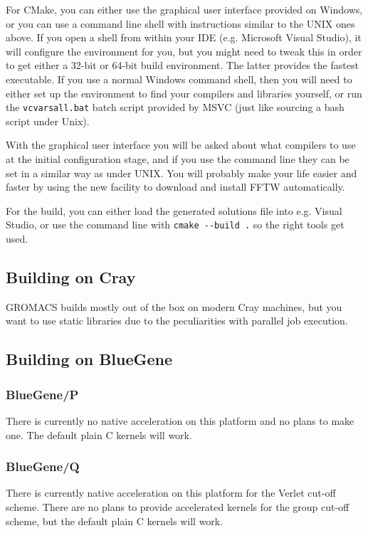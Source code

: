 \documentclass{article}[12pt,a4paper,twoside]
\newcommand{\gromacs}{GROMACS}
\newcommand{\fftw}{FFTW}
\newcommand{\cmake}{CMake}
\begin{document}
\begin{enumerate}
For \cmake{}, you can either use the graphical user interface provided
on Windows, or you can use a command line shell with instructions
similar to the UNIX ones above. If you open a shell from within
your IDE (e.g. Microsoft Visual Studio), it will configure the
environment for you, but you might need to tweak this in order to 
get either a 32-bit or 64-bit build environment. The latter provides the
fastest executable. If you use a normal Windows command shell, then
you will need to either set up the environment to find your compilers
and libraries yourself, or run the \verb+vcvarsall.bat+ batch script
provided by MSVC (just like sourcing a bash script under
Unix). 

With the graphical user interface you will be asked about what compilers
to use at the initial configuration stage, and if you use the command line
they can be set in a similar way as under UNIX.
You will probably make your life easier and faster by using the
new facility to download and install \fftw{} automatically. 

For the build, you can either load the generated solutions file into
e.g. Visual Studio, or use the command line with \verb+cmake --build .+ 
so the right tools get used.

\subsection{Building on Cray}

\gromacs{} builds mostly out of the box on modern Cray machines,
but you want to use static libraries due to the peculiarities with
parallel job execution.

\subsection{Building on BlueGene}

\subsubsection{BlueGene/P}

There is currently no native acceleration on this platform and no
plans to make one. The default plain C kernels will work.

\subsubsection{BlueGene/Q}

There is currently native acceleration on this platform for the Verlet
cut-off scheme. There are no plans to provide accelerated kernels for
the group cut-off scheme, but the default plain C kernels will work.


\end{enumerate}
\end{document}
